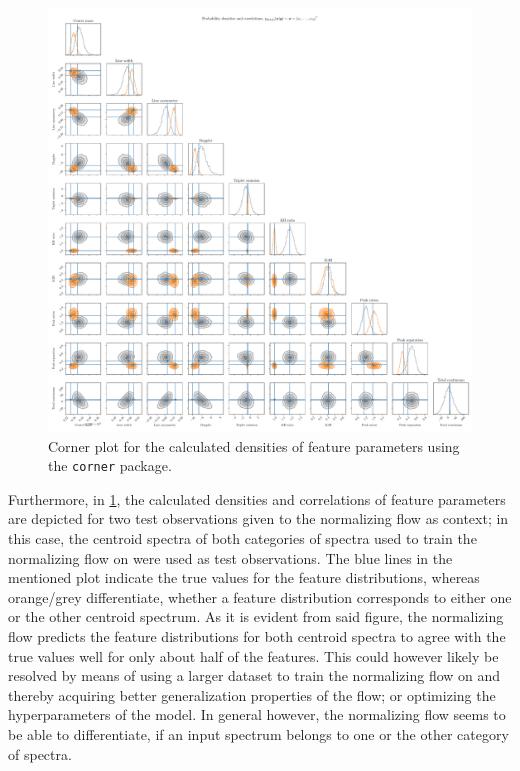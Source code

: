 \documentclass[a4paper,12pt]{report}
\begin{document}
\begin{figure}[h!]
\centering
\includegraphics[width=\textwidth]{figures/nf-feature-extraction-example-3-corner.pdf}
\cprotect\caption{Corner plot for the calculated densities of feature parameters using the \verb|corner| package.}
\label{fig:nf-feature-extraction-example-3-corner}
\end{figure}

Furthermore, in \cref{fig:nf-feature-extraction-example-3-corner}, the calculated densities and correlations of feature parameters are depicted for two test observations given to the normalizing flow as context; in this case, the centroid spectra of both categories of spectra used to train the normalizing flow on were used as test observations. The blue lines in the mentioned plot indicate the true values for the feature distributions, whereas orange/grey differentiate, whether a feature distribution corresponds to either one or the other centroid spectrum. As it is evident from said figure, the normalizing flow predicts the feature distributions for both centroid spectra to agree with the true values well for only about half of the features. This could however likely be resolved by means of using a larger dataset to train the normalizing flow on and thereby acquiring better generalization properties of the flow; or optimizing the hyperparameters of the model. In general however, the normalizing flow seems to be able to differentiate, if an input spectrum belongs to one or the other category of spectra.
\end{document}
